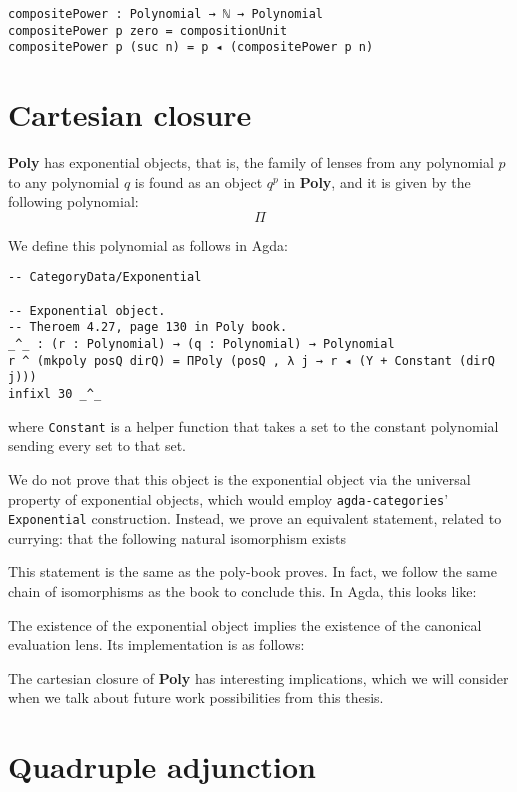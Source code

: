 \begin{verbatim}
compositePower : Polynomial → ℕ → Polynomial
compositePower p zero = compositionUnit
compositePower p (suc n) = p ◂ (compositePower p n) 
\end{verbatim}

\section{Cartesian closure}

\textbf{Poly} has exponential objects, that is, the family of lenses from any polynomial $p$ to any polynomial $q$ is found as an object $q^p$ in \textbf{Poly}, and it is given by the following polynomial:
$$
\Pi
$$

We define this polynomial as follows in Agda:
\begin{verbatim}
-- CategoryData/Exponential

-- Exponential object.
-- Theroem 4.27, page 130 in Poly book.
_^_ : (r : Polynomial) → (q : Polynomial) → Polynomial
r ^ (mkpoly posQ dirQ) = ΠPoly (posQ , λ j → r ◂ (Y + Constant (dirQ j)))
infixl 30 _^_
\end{verbatim}
where \texttt{Constant} is a helper function that takes a set to the constant polynomial sending every set to that set.

We do not prove that this object is the exponential object via the universal property of exponential objects, which would employ \texttt{agda-categories}' \texttt{Exponential} construction. Instead, we prove an equivalent statement, related to currying: that the following natural isomorphism exists 
$$
$$

This statement is the same as the poly-book proves. In fact, we follow the same chain of isomorphisms as the book to conclude this. In Agda, this looks like:

The existence of the exponential object implies the existence of the canonical evaluation lens. Its implementation is as follows:


The cartesian closure of \textbf{Poly} has interesting implications, which we will consider when we talk about future work possibilities from this thesis.
\section{Quadruple adjunction}


